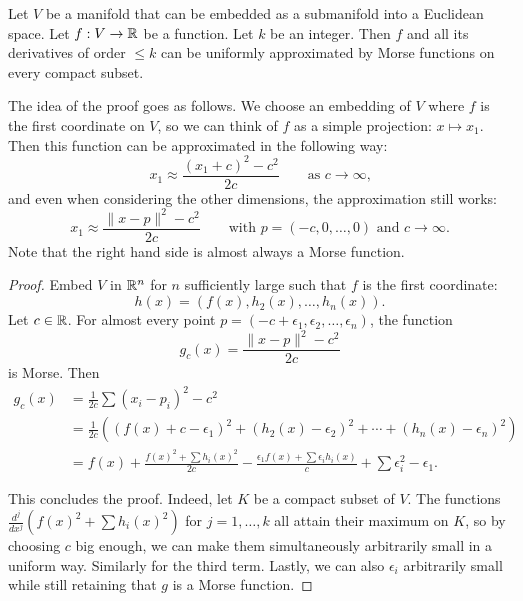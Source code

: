 \begin{prop}
    Let $V$ be a manifold that can be embedded as a submanifold into a Euclidean space.
    Let $f: V \to  \mathbb{R}$ be a function.
    Let $k$ be an integer.
    Then $f$ and all its derivatives of order $\le k$ can be uniformly
    approximated by Morse functions on every compact subset.
\end{prop}

The idea of the proof goes as follows.
We choose an embedding of $V$ where $f$ is the first coordinate on $V$, so we can think of $f$ as a simple projection: $x \mapsto x_1$.
Then this function can be approximated in the following way:
\[
    x_1 \approx \frac{(x_1+c)^2 - c^2}{2c} \qquad \text{as $c \to  \infty$,}
\]
and even when considering the other dimensions, the approximation still works:
\[
    x_1 \approx \frac{\|x - p\|^2 - c^2}{2c} \qquad \text{with $p = (-c, 0, \ldots, 0)$ and $c\to  \infty$}
.\] 
Note that the right hand side is almost always a Morse function.

\begin{proof}
    Embed $V$ in $\mathbb{R}^{n}$ for $n$ sufficiently large such that $f$ is the first coordinate:
    \[
        h(x) = (f(x), h_2(x), \ldots, h_n(x))
    .\] 
    Let $c \in \mathbb{R}$. For almost every point $p = (-c + \epsilon_1, \epsilon_2, \ldots, \epsilon_n)$, the function
    \[
        g_c(x) = \frac{\|x - p\|^2 - c^2}{2c} 
    \] 
    is Morse.
    Then
    \begin{align*}
        g_c(x) &= \frac{1}{2c}  \sum (x_i - p_i)^2 - c^2\\
             &= \frac{1}{2c} \left((f(x) + c - \epsilon_1 )^2 + (h_2(x) - \epsilon_2)^2 + \cdots + (h_n(x) - \epsilon_n)^2\right)\\
             &= f(x) +  \frac{f(x)^2 + \sum h_i(x)^2}{2c} - \frac{\epsilon_1 f(x)  + \sum \epsilon_i h_i(x)}{c}  + \sum \epsilon_i^2 - \epsilon_1
    .\end{align*} 

    This concludes the proof.
    Indeed, let $K$ be a compact subset of $V$.
    The functions $\frac{d^{j}}{dx^{j}} (f(x)^2 + \sum h_i(x)^2)$ for $j = 1, \ldots,k$ all attain their maximum on $K$, so by choosing $c$ big enough, we can make them simultaneously arbitrarily small in a uniform way. Similarly for the third term.
    Lastly, we can also $\epsilon_i$ arbitrarily small while still retaining that $g$ is a Morse function.
\end{proof}

\begin{figure}
    \centering
    \label{fig:approximate-morse-functions}
\end{figure}





